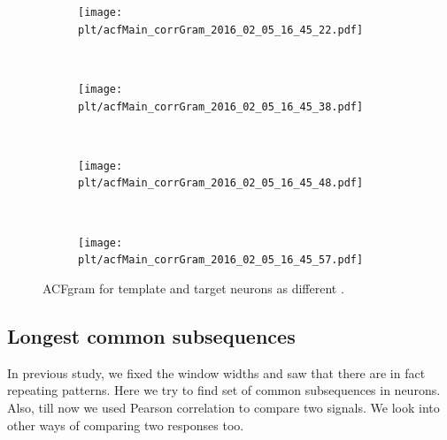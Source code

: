 \documentclass[11pt,paper=a4,answers]{exam}
\newcommand{\plt}{../../plots}
\begin{document}
\begin{figure}
    \centering
    \begin{subfigure}[b]{.48\textwidth}
        \centering
        \texttt{[image: \\plt/acfMain\_corrGram\_2016\_02\_05\_16\_45\_22.pdf]}
    \end{subfigure}
    ~
    \begin{subfigure}[b]{.48\textwidth}
        \centering
        \texttt{[image: \\plt/acfMain\_corrGram\_2016\_02\_05\_16\_45\_38.pdf]}
    \end{subfigure}
    \\
    \begin{subfigure}[b]{.48\textwidth}
        \centering
        \texttt{[image: \\plt/acfMain\_corrGram\_2016\_02\_05\_16\_45\_48.pdf]}
    \end{subfigure}
    ~
    \begin{subfigure}[b]{.48\textwidth}
        \centering
        \texttt{[image: \\plt/acfMain\_corrGram\_2016\_02\_05\_16\_45\_57.pdf]}
    \end{subfigure}
    \caption{ACFgram for template and target neurons as different .}
    \label{img:acfgram2}
\end{figure}

\subsection{Longest common subsequences} %
\label{sub:longest_common_subsequences}
In previous study, we fixed the window widths and saw that there are in fact repeating patterns. Here we try to find set of common subsequences in neurons. Also, till now we used Pearson correlation to compare two signals. We look into other ways of comparing two responses too.
\end{document}
